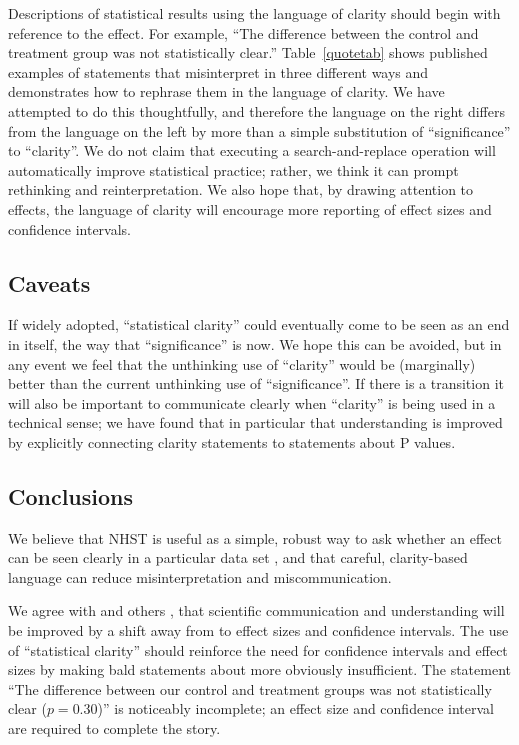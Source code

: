 Descriptions of statistical results using the language of clarity should begin with reference to the effect. For example, ``The difference between the control and treatment group was not statistically clear.'' Table~\ref{quotetab} shows published examples of statements that misinterpret \pvals in three different ways and demonstrates how to rephrase them in the language of clarity. We have attempted to do this thoughtfully, and therefore the language on the right differs from the language on the left by more than a simple substitution of ``significance'' to ``clarity''. We do not claim that executing a search-and-replace operation will automatically improve statistical practice; rather, we think it can prompt rethinking and reinterpretation. We also hope that, by drawing attention to effects, the language of clarity will encourage more reporting of effect sizes and confidence intervals.

\subsection*{Caveats}

If widely adopted, ``statistical clarity'' could eventually come to be seen as an end in itself, the way that ``significance'' is now. We hope this can be avoided, but in any event we feel that the unthinking use of ``clarity'' would be (marginally) better than the current unthinking use of ``significance''. If there is a transition it will also be important to communicate clearly when ``clarity'' is being used in a technical sense; we have found that in particular that understanding is improved by explicitly connecting clarity statements to statements about P values.

\subsection*{Conclusions}

\noindent We believe that NHST is useful as a simple, robust way to ask whether an effect can be seen clearly in a particular data set \citep{robinson2001past}, and that careful, clarity-based language can reduce misinterpretation and miscommunication.

We agree with \citet{Cohen1994} and others \citep{Goodman1999, ZiliakandMcCloskey2008, WassersteinandLazar2016}, that scientific communication and understanding will be improved by a shift away from \pvals to effect sizes and confidence intervals. The use of ``statistical clarity'' should reinforce the need for confidence intervals and effect sizes by making bald statements about \pvals more obviously insufficient. The statement ``The difference between our control and treatment groups was not statistically clear ($p = 0.30$)'' is noticeably incomplete; an effect size and confidence interval are required to complete the story.

